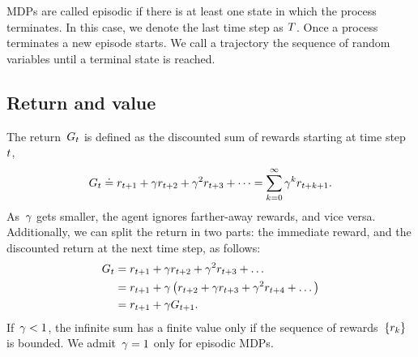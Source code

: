 MDPs are called episodic if there is at least one state in which the process terminates. In this case, we denote the last time step as ${T}$. Once a process terminates a new episode starts. We call a trajectory the sequence of random variables until a terminal state is reached.

\subsection{Return and value}
The return~${G_{t}}$ is defined as the discounted sum of rewards starting at time step~${t}$,
\begin{equation}
    G_{t}\doteq r_{t+1}+\gamma r_{t+2}+\gamma^{2}r_{t+3}+\dots=\sum_{k=0}^{\infty}\gamma^{k}r_{t+k+1}.
\end{equation}
As~${\gamma}$ gets smaller, the agent ignores farther-away rewards, and vice versa. Additionally, we can split the return in two parts: the immediate reward, and the discounted return at the next time step, as follows:
\begin{align} \label{eq:recursive_returns}
    G_{t}
        &=r_{t+1}+\gamma r_{t+2}+\gamma^{2}r_{t+3}+\dots \notag \\
        &=r_{t+1}+\gamma\left(r_{t+2}+\gamma r_{t+3}+\gamma^{2}r_{t+4}+\dots\right) \notag \\
        &=r_{t+1}+\gamma G_{t+1}.
\end{align}
If~${\gamma<1}$, the infinite sum has a finite value only if the sequence of rewards~${\left\{r_{k}\right\}}$ is bounded. We admit~${\gamma=1}$ only for episodic MDPs.

